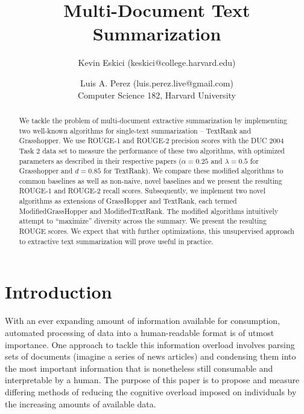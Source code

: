 \documentclass[10pt]{article}
\title{Multi-Document Text Summarization}
\author{Kevin Eskici (keskici@college.harvard.edu) \and Luis A. Perez (luis.perez.live@gmail.com)\\
Computer Science 182, Harvard University}
\begin{document}
\maketitle{}

\begin{abstract}
   We tackle the problem of multi-document extractive summarization by implementing two well-known algorithms for single-text summarization -- {\sc TextRank} and {\sc Grasshopper}.  We use ROUGE-1 and ROUGE-2 precision scores with the DUC 2004 Task 2 data set to measure the performance of these two algorithms, with optimized parameters as described in their respective papers ($\alpha =0.25$ and $\lambda=0.5$ for Grasshopper and $d=0.85$ for TextRank). We compare these modified algorithms to common baselines as well as non-naive, novel baselines and we present the resulting ROUGE-1 and ROUGE-2 recall scores. Subsequently, we implement two novel algorithms as extensions of {\sc GrassHopper} and {\sc TextRank}, each termed {\sc ModifiedGrassHopper} and {\sc ModifiedTextRank}. The modified algorithms intuitively attempt to ``maximize'' diversity across the summary. We present the resulting ROUGE scores. We expect that with further optimizations, this unsupervised approach to extractive text summarization will prove useful in practice.
\end{abstract}

\section{Introduction}
With an ever expanding amount of information available for consumption, automated processing of data into a human-readable format is of utmost importance. One approach to tackle this information overload involves  parsing sets of documents (imagine a series of news articles) and condensing them into the most important information that is nonetheless still consumable and interpretable by a human. The purpose of this paper is to propose and measure differing methods of reducing the cognitive overload imposed on individuals by the increasing amounts of available data.
\end{document}
